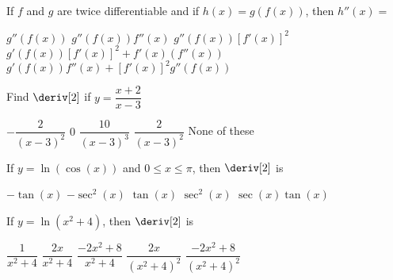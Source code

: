 \begin{questions}
    \question If $f$ and $g$ are twice differentiable and if $h(x) = g\left(f(x)\right)$, then $h''(x) = $ \\

    \begin{oneparchoices}
        \choice $g''\left(f(x)\right)$ 
        \choice $g''\left(f(x)\right)f''(x)$ 
        \choice $g''\left(f(x)\right)\left[f'(x)\right]^2$ \\[11pt]
        \makebox[0.07\textwidth] \choice $g'\left(f(x)\right)\left[f'(x)\right]^2 + f'(x)\left(f''(x)\right)$ 
        \makebox[0.13\textwidth] \choice $g'\left(f(x)\right)f''(x) + \left[f'(x)\right]^2g''\left(f(x)\right)$ 
    \end{oneparchoices} \par \horizontalline

    \question Find $\deriv[2]$ if $y = \dfrac{x + 2}{x - 3}$ \\

    \begin{oneparchoices}
        \choice $-\dfrac{2}{(x - 3)^2}$
        \choice $0$
        \choice $\dfrac{10}{(x - 3)^3}$
        \choice $\dfrac{2}{(x - 3)^2}$
        \choice None of these
    \end{oneparchoices} \par \horizontalline

    \question If $y = \ln (\cos (x))$ and $0 \leq x \leq \pi$, then $\deriv[2]$ is \\

    \begin{oneparchoices}
        \choice $-\tan (x)$
        \choice $-\sec^2 (x)$
        \choice $\tan (x)$
        \choice $\sec^2 (x)$
        \choice $\sec (x)\tan (x)$
    \end{oneparchoices} \par \horizontalline

    \question If $y = \ln \left(x^2 + 4\right)$, then $\deriv[2]$ is \\

    \begin{oneparchoices}
        \choice $\dfrac{1}{x^2 + 4}$ 
        \choice $\dfrac{2x}{x^2 + 4}$
        \choice $\dfrac{-2x^2 + 8}{x^2 + 4}$
        \choice $\dfrac{2x}{\left(x^2 + 4\right)^2}$
        \choice $\dfrac{-2x^2 + 8}{\left(x^2 + 4\right)^2}$
    \end{oneparchoices} \par \horizontalline


\end{questions}
